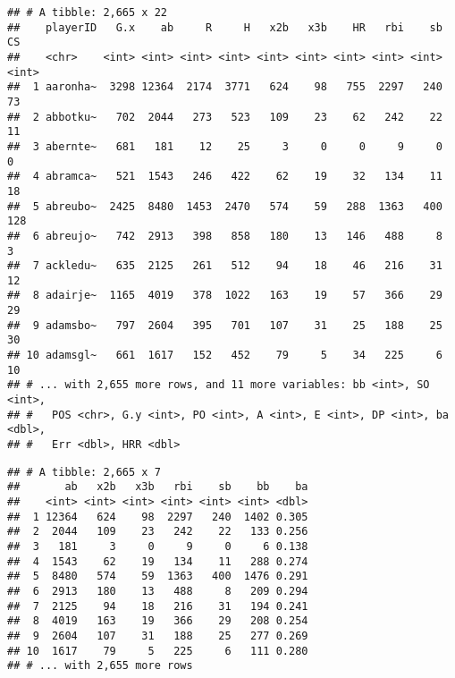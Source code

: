\documentclass[]{book}
\newenvironment{Shaded}{\begin{snugshade}}{\end{snugshade}}
\newcommand{\KeywordTok}[1]{\textcolor[rgb]{0.13,0.29,0.53}{\textbf{#1}}}
\newcommand{\StringTok}[1]{\textcolor[rgb]{0.31,0.60,0.02}{#1}}
\newcommand{\OperatorTok}[1]{\textcolor[rgb]{0.81,0.36,0.00}{\textbf{#1}}}
\newcommand{\NormalTok}[1]{#1}
\begin{document}
\begin{verbatim}
## # A tibble: 2,665 x 22
##    playerID   G.x    ab     R     H   x2b   x3b    HR   rbi    sb    CS
##    <chr>    <int> <int> <int> <int> <int> <int> <int> <int> <int> <int>
##  1 aaronha~  3298 12364  2174  3771   624    98   755  2297   240    73
##  2 abbotku~   702  2044   273   523   109    23    62   242    22    11
##  3 abernte~   681   181    12    25     3     0     0     9     0     0
##  4 abramca~   521  1543   246   422    62    19    32   134    11    18
##  5 abreubo~  2425  8480  1453  2470   574    59   288  1363   400   128
##  6 abreujo~   742  2913   398   858   180    13   146   488     8     3
##  7 ackledu~   635  2125   261   512    94    18    46   216    31    12
##  8 adairje~  1165  4019   378  1022   163    19    57   366    29    29
##  9 adamsbo~   797  2604   395   701   107    31    25   188    25    30
## 10 adamsgl~   661  1617   152   452    79     5    34   225     6    10
## # ... with 2,655 more rows, and 11 more variables: bb <int>, SO <int>,
## #   POS <chr>, G.y <int>, PO <int>, A <int>, E <int>, DP <int>, ba <dbl>,
## #   Err <dbl>, HRR <dbl>
\end{verbatim}

\begin{Shaded}
\end{Shaded}

\begin{verbatim}
## # A tibble: 2,665 x 7
##       ab   x2b   x3b   rbi    sb    bb    ba
##    <int> <int> <int> <int> <int> <int> <dbl>
##  1 12364   624    98  2297   240  1402 0.305
##  2  2044   109    23   242    22   133 0.256
##  3   181     3     0     9     0     6 0.138
##  4  1543    62    19   134    11   288 0.274
##  5  8480   574    59  1363   400  1476 0.291
##  6  2913   180    13   488     8   209 0.294
##  7  2125    94    18   216    31   194 0.241
##  8  4019   163    19   366    29   208 0.254
##  9  2604   107    31   188    25   277 0.269
## 10  1617    79     5   225     6   111 0.280
## # ... with 2,655 more rows
\end{verbatim}
\end{document}
